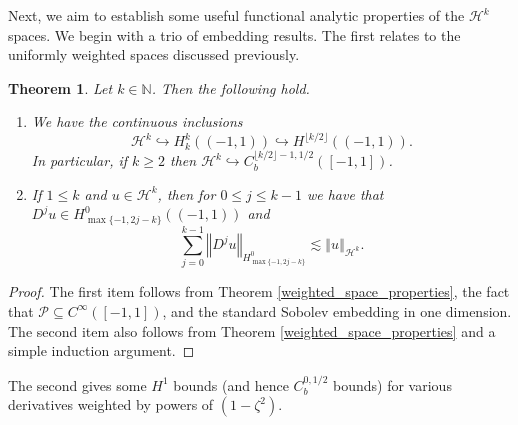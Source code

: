 \documentclass[11pt,reqno]{amsart}
\numberwithin{equation}{section}
\providecommand{\norm}[1]{\left\Vert#1\right\Vert}
\def\ls{\lesssim}
\providecommand{\norm}[1]{\left\Vert#1\right\Vert}
\def\ls{\lesssim}
\def\h{\mathcal{H}}
\def\N{\mathbb{N}}
\newtheorem{thm}[lem]{Theorem}
\begin{document}
Next, we aim to establish some useful functional analytic properties of the $\h^k$ spaces.  We begin with a trio of embedding results.  The first relates to the uniformly weighted spaces discussed previously.


\begin{thm}\label{hk_weight_improvement}
Let $k \in \N$.  Then the following hold.
\begin{enumerate}
 \item We have the continuous inclusions 
\begin{equation}
\h^k \hookrightarrow H^k_k((-1,1)) \hookrightarrow  H^{\lfloor k/2\rfloor}((-1,1)).
\end{equation}
In particular, if $k \ge 2$ then $\h^k \hookrightarrow C^{\lfloor k/2\rfloor -1, 1/2}_b([-1,1])$.
 
 \item If $1 \le k$ and $u \in \h^k$, then for $0 \le j \le k-1$ we have that $D^j u \in H^0_{\max\{-1,2j-k\}}((-1,1))$ and 
\begin{equation}
 \sum_{j=0}^{k-1} \norm{D^j u}_{H^0_{\max\{-1,2j-k\}}} \ls \norm{u}_{\h^k}.
\end{equation}
\end{enumerate}
\end{thm}
\begin{proof}
The first item follows from  Theorem \ref{weighted_space_properties}, the fact that $\mathcal{P} \subseteq C^\infty([-1,1])$, and the standard Sobolev embedding in one dimension.   The second item also  follows from  Theorem  \ref{weighted_space_properties} and a simple induction argument.
\end{proof}


The second gives some $H^1$ bounds (and hence $C^{0,1/2}_b$ bounds) for various derivatives weighted by powers of $(1-\zeta^2)$.
 
\end{document}
